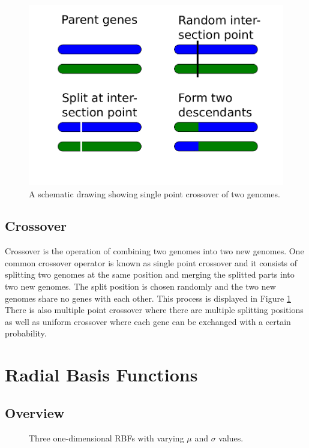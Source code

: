 \documentclass[a4paper,11pt]{kth-mag}
\begin{document}
\begin{figure}
\centering\includegraphics[scale=0.5]{crossover}
\caption{A schematic drawing showing single point crossover of two genomes.}
\label{crossover-figure}
\end{figure}

\subsection{Crossover}
Crossover is the operation of combining two genomes into two new genomes. One common crossover operator is known as  single point crossover and it consists of splitting two genomes at the same position and merging the splitted parts into two new genomes. The split position is chosen randomly and the two new genomes share no genes with each other. This process is displayed in Figure \ref{crossover-figure} There is also multiple point crossover where there are multiple splitting positions as well as uniform crossover where each gene can be exchanged with a certain probability.




\section{Radial Basis Functions}
\subsection{Overview}

\begin{figure}
\caption{Three one-dimensional RBFs with varying $\mu$ and $\sigma$ values.}
\end{figure}
\end{document}

